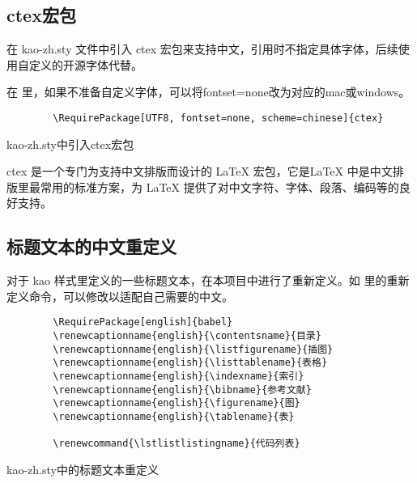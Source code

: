 \subsection{ctex宏包}

在 kao-zh.sty 文件中引入 ctex 宏包来支持中文，引用时不指定具体字体，后续使用自定义的开源字体代替。

在  里，如果不准备自定义字体，可以将fontset=none改为对应的mac或windows。

\begin{listing}[H]
    \begin{verbatim}
        \RequirePackage[UTF8, fontset=none, scheme=chinese]{ctex}
    \end{verbatim}
    \caption{kao-zh.sty中引入ctex宏包}
\end{listing}

ctex 是一个专门为支持中文排版而设计的 LaTeX 宏包，它是LaTeX 中是中文排版里最常用的标准方案，为 LaTeX 提供了对中文字符、字体、段落、编码等的良好支持。

\subsection{标题文本的中文重定义}
对于 kao 样式里定义的一些标题文本，在本项目中进行了重新定义。如  里的重新定义命令，可以修改以适配自己需要的中文。

\begin{listing}[H]
    \begin{verbatim}
        \RequirePackage[english]{babel}
        \renewcaptionname{english}{\contentsname}{目录}
        \renewcaptionname{english}{\listfigurename}{插图}
        \renewcaptionname{english}{\listtablename}{表格}
        \renewcaptionname{english}{\indexname}{索引}
        \renewcaptionname{english}{\bibname}{参考文献}
        \renewcaptionname{english}{\figurename}{图}
        \renewcaptionname{english}{\tablename}{表}
        
        \renewcommand{\lstlistlistingname}{代码列表}
    \end{verbatim}
    \caption{kao-zh.sty中的标题文本重定义}
\end{listing}

